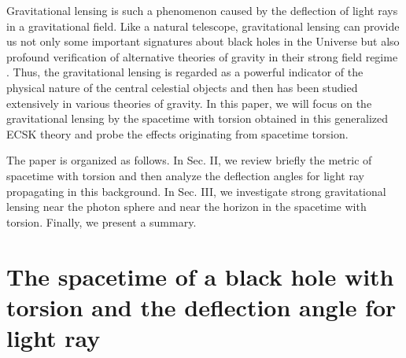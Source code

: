 \documentclass[aps,showpacs,preprintnumbers,amsmath,amssymb]{revtex4}
\begin{document}
Gravitational lensing is such a phenomenon caused
by the deflection of light rays in a gravitational field.
Like a natural telescope, gravitational lensing can provide us
not only some important signatures about black holes in the
Universe but also profound verification of alternative theories
of gravity in their strong field regime \cite{Ein1,Darwin,KS1,KS2,KS4, VB1,VB2,VB202,Gyulchev,Gyulchev1,Fritt,Bozza1,Eirc1,whisk,
Bhad1,Song1,Song2,TSa1,AnAv,agl1,agl101,gr1,gr2,gr201,gr3,gr4,gr401}. Thus,
the gravitational lensing is regarded as a powerful
indicator of the physical nature of the central celestial
objects and then has been studied extensively in various theories of gravity.
In this paper, we will focus on the gravitational
lensing by the spacetime with torsion obtained in this generalized ECSK theory and probe the effects originating from spacetime torsion.

The paper is organized as follows. In Sec. II, we review briefly the metric of spacetime with torsion and then analyze the deflection angles for light ray propagating in this background. In Sec. III, we investigate strong gravitational lensing near the photon sphere and near the horizon in the spacetime with torsion. Finally, we present a summary.


\section{The spacetime of a black hole with torsion and the deflection angle for light ray}
\end{document}
